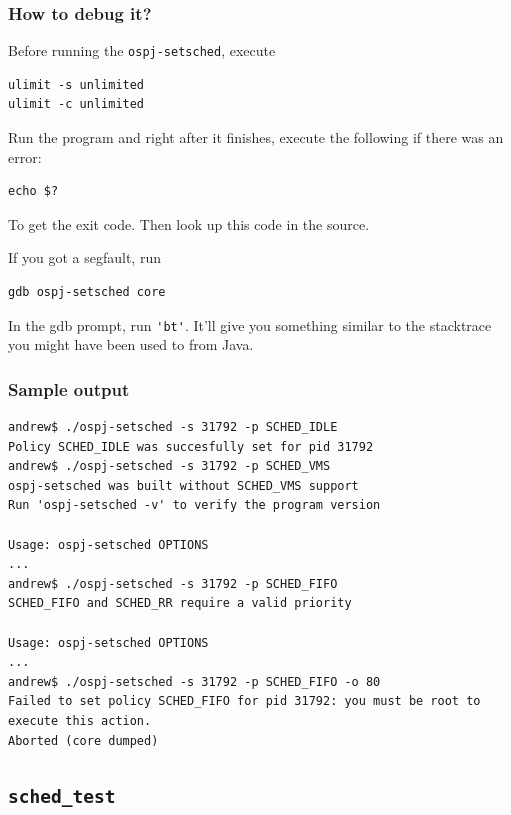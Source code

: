 \documentclass[]{report}
\begin{document}
\subsubsection{How to debug it?}\label{how-to-debug-it}

Before running the \lstinline!ospj-setsched!, execute

\begin{lstlisting}[style=simple]
ulimit -s unlimited
ulimit -c unlimited
\end{lstlisting}

Run the program and right after it finishes, execute the following if
there was an error:

\begin{lstlisting}[style=simple]
echo $? 
\end{lstlisting}

To get the exit code. Then look up this code in the source.

If you got a segfault, run

\begin{lstlisting}[style=simple]
gdb ospj-setsched core
\end{lstlisting}

In the gdb prompt, run \lstinline!'bt'!. It'll give you something
similar to the stacktrace you might have been used to from Java.

\subsubsection{Sample output}\label{sample-output}

\begin{lstlisting}[style=simple]
andrew$ ./ospj-setsched -s 31792 -p SCHED_IDLE
Policy SCHED_IDLE was succesfully set for pid 31792
andrew$ ./ospj-setsched -s 31792 -p SCHED_VMS
ospj-setsched was built without SCHED_VMS support
Run 'ospj-setsched -v' to verify the program version

Usage: ospj-setsched OPTIONS
...
andrew$ ./ospj-setsched -s 31792 -p SCHED_FIFO
SCHED_FIFO and SCHED_RR require a valid priority

Usage: ospj-setsched OPTIONS
...
andrew$ ./ospj-setsched -s 31792 -p SCHED_FIFO -o 80
Failed to set policy SCHED_FIFO for pid 31792: you must be root to execute this action.
Aborted (core dumped)
\end{lstlisting}

\subsection{\lstinline!sched_test!}\label{schedux5ftest}
\end{document}
